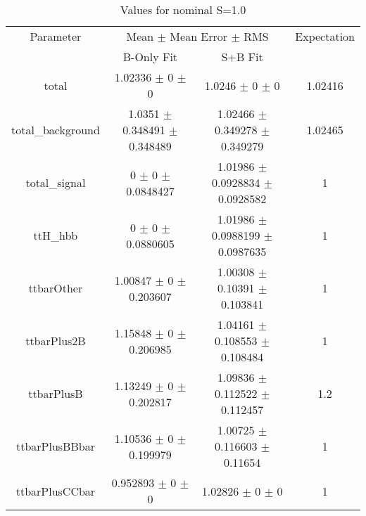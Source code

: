\begin{table}
\centering
\caption{Values for nominal S=1.0}
\begin{tabular}{cccc}
\toprule
Parameter & \multicolumn{2}{c}{Mean $\pm$ Mean Error $\pm$ RMS} & Expectation\\
 & B-Only Fit & S+B Fit & \\
\midrule
total & \num{1.02336} $\pm$ \num{0} $\pm$ \num{0} & \num{1.0246} $\pm$ \num{0} $\pm$ \num{0} & \num{1.02416}\\
total\_background & \num{1.0351} $\pm$ \num{0.348491} $\pm$ \num{0.348489} & \num{1.02466} $\pm$ \num{0.349278} $\pm$ \num{0.349279} & \num{1.02465}\\
total\_signal & \num{0} $\pm$ \num{0} $\pm$ \num{0.0848427} & \num{1.01986} $\pm$ \num{0.0928834} $\pm$ \num{0.0928582} & \num{1}\\
ttH\_hbb & \num{0} $\pm$ \num{0} $\pm$ \num{0.0880605} & \num{1.01986} $\pm$ \num{0.0988199} $\pm$ \num{0.0987635} & \num{1}\\
ttbarOther & \num{1.00847} $\pm$ \num{0} $\pm$ \num{0.203607} & \num{1.00308} $\pm$ \num{0.10391} $\pm$ \num{0.103841} & \num{1}\\
ttbarPlus2B & \num{1.15848} $\pm$ \num{0} $\pm$ \num{0.206985} & \num{1.04161} $\pm$ \num{0.108553} $\pm$ \num{0.108484} & \num{1}\\
ttbarPlusB & \num{1.13249} $\pm$ \num{0} $\pm$ \num{0.202817} & \num{1.09836} $\pm$ \num{0.112522} $\pm$ \num{0.112457} & \num{1.2}\\
ttbarPlusBBbar & \num{1.10536} $\pm$ \num{0} $\pm$ \num{0.199979} & \num{1.00725} $\pm$ \num{0.116603} $\pm$ \num{0.11654} & \num{1}\\
ttbarPlusCCbar & \num{0.952893} $\pm$ \num{0} $\pm$ \num{0} & \num{1.02826} $\pm$ \num{0} $\pm$ \num{0} & \num{1}\\
\bottomrule
\end{tabular}
\end{table}